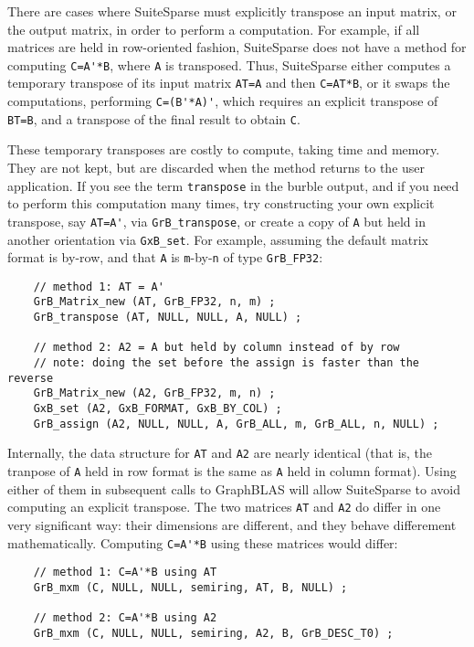 \documentclass[12pt]{article}
\begin{document}
There are cases where SuiteSparse must explicitly transpose an input matrix, or
the output matrix, in order to perform a computation.  For example, if all
matrices are held in row-oriented fashion, SuiteSparse does not have a method
for computing \verb"C=A'*B", where \verb'A' is transposed.  Thus, SuiteSparse
either computes a temporary transpose of its input matrix \verb'AT=A' and then
\verb'C=AT*B', or it swaps the computations, performing \verb"C=(B'*A)'", which
requires an explicit transpose of \verb'BT=B', and a transpose of the final
result to obtain \verb'C'.

These temporary transposes are costly to compute, taking time and memory.  They
are not kept, but are discarded when the method returns to the user
application.  If you see the term \verb'transpose' in the burble output, and if
you need to perform this computation many times, try constructing your own
explicit transpose, say \verb"AT=A'", via \verb'GrB_transpose', or create a
copy of \verb'A' but held in another orientation via \verb'GxB_set'.  For
example, assuming the default matrix format is by-row, and that \verb'A' is
\verb'm'-by-\verb'n' of type \verb'GrB_FP32':

    {\footnotesize
    \begin{verbatim}
    // method 1: AT = A'
    GrB_Matrix_new (AT, GrB_FP32, n, m) ;
    GrB_transpose (AT, NULL, NULL, A, NULL) ;

    // method 2: A2 = A but held by column instead of by row
    // note: doing the set before the assign is faster than the reverse
    GrB_Matrix_new (A2, GrB_FP32, m, n) ;
    GxB_set (A2, GxB_FORMAT, GxB_BY_COL) ;
    GrB_assign (A2, NULL, NULL, A, GrB_ALL, m, GrB_ALL, n, NULL) ; \end{verbatim}}

Internally, the data structure for \verb'AT' and \verb'A2' are nearly identical
(that is, the tranpose of \verb'A' held in row format is the same as \verb'A'
held in column format).  Using either of them in subsequent calls to GraphBLAS
will allow SuiteSparse to avoid computing an explicit transpose.  The two
matrices \verb'AT' and \verb'A2' do differ in one very significant way:  their
dimensions are different, and they behave differement mathematically.
Computing \verb"C=A'*B" using these matrices would differ:

    {\footnotesize
    \begin{verbatim}
    // method 1: C=A'*B using AT
    GrB_mxm (C, NULL, NULL, semiring, AT, B, NULL) ;

    // method 2: C=A'*B using A2
    GrB_mxm (C, NULL, NULL, semiring, A2, B, GrB_DESC_T0) ; \end{verbatim}}
\end{document}

